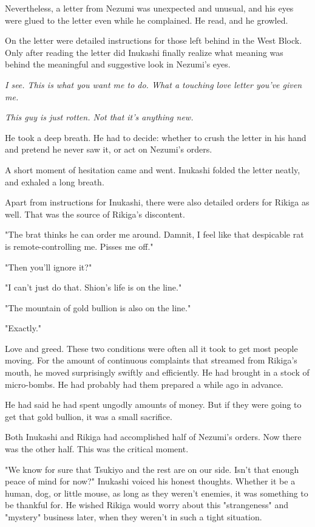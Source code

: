 Nevertheless, a letter from Nezumi was unexpected and unusual, and his
eyes were glued to the letter even while he complained. He read, and he
growled.

On the letter were detailed instructions for those left behind in the
West Block. Only after reading the letter did Inukashi finally realize
what meaning was behind the meaningful and suggestive look in Nezumi's
eyes.

\emph{I see. This is what you want me to do. What a touching love letter
you've given me.}

\emph{This guy is just rotten. Not that it's anything new.}

He took a deep breath. He had to decide: whether to crush the letter in
his hand and pretend he never saw it, or act on Nezumi's orders.

A short moment of hesitation came and went. Inukashi folded the letter
neatly, and exhaled a long breath.

Apart from instructions for Inukashi, there were also detailed orders
for Rikiga as well. That was the source of Rikiga's discontent.

"The brat thinks he can order me around. Damnit, I feel like that
despicable rat is remote-controlling me. Pisses me off."

"Then you'll ignore it?"

"I can't just do that. Shion's life is on the line."

"The mountain of gold bullion is also on the line."

"Exactly."

Love and greed. These two conditions were often all it took to get most
people moving. For the amount of continuous complaints that streamed
from Rikiga's mouth, he moved surprisingly swiftly and efficiently. He
had brought in a stock of micro-bombs. He had probably had them prepared
a while ago in advance.

He had said he had spent ungodly amounts of money. But if they were
going to get that gold bullion, it was a small sacrifice.

Both Inukashi and Rikiga had accomplished half of Nezumi's orders. Now
there was the other half. This was the critical moment.

"We know for sure that Tsukiyo and the rest are on our side. Isn't that
enough peace of mind for now?" Inukashi voiced his honest thoughts.
Whether it be a human, dog, or little mouse, as long as they weren't
enemies, it was something to be thankful for. He wished Rikiga would
worry about this "strangeness" and "mystery" business later, when they
weren't in such a tight situation.

